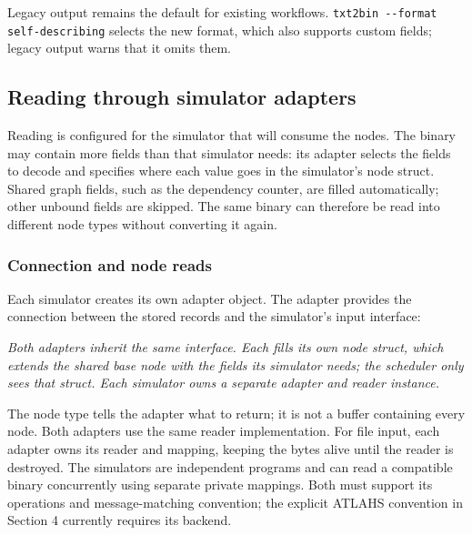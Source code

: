 \documentclass[10pt,a4paper]{article}
\begin{document}
Legacy output remains the default for existing workflows. \texttt{txt2bin -\allowbreak{}-\allowbreak{}format self-\allowbreak{}describing} selects the new format, which also supports custom fields; legacy output warns that it omits them.

\hypertarget{reading-through-simulator-adapters}{}
\subsection{Reading through simulator adapters}

Reading is configured for the simulator that will consume the nodes. The binary may contain more fields than that simulator needs: its adapter selects the fields to decode and specifies where each value goes in the simulator's node struct. Shared graph fields, such as the dependency counter, are filled automatically; other unbound fields are skipped. The same binary can therefore be read into different node types without converting it again.

\hypertarget{connection-and-node-reads}{}
\subsubsection{Connection and node reads}

Each simulator creates its own adapter object. The adapter provides the connection between the stored records and the simulator's input interface:

\begin{center}
\resizebox{\linewidth}{!}{}
\par\nopagebreak\small\itshape Both adapters inherit the same interface. Each fills its own node struct, which extends the shared base node with the fields its simulator needs; the scheduler only sees that struct. Each simulator owns a separate adapter and reader instance.
\end{center}

The node type tells the adapter what to return; it is not a buffer containing every node. Both adapters use the same reader implementation. For file input, each adapter owns its reader and mapping, keeping the bytes alive until the reader is destroyed. The simulators are independent programs and can read a compatible binary concurrently using separate private mappings. Both must support its operations and message-matching convention; the explicit ATLAHS convention in Section 4 currently requires its backend.
\end{document}
